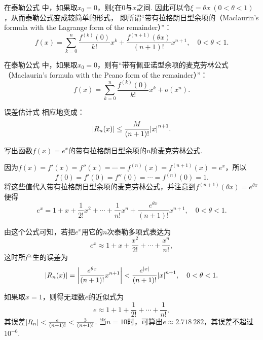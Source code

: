 在泰勒公式  中，如果取\(x_0 = 0\)，则\(\xi\)在\(0\)与\(x\)之间.
因此可以令\(\xi = \theta x\ (0 < \theta < 1)\)，从而泰勒公式变成较简单的形式，%
即所谓“带有拉格朗日型余项的（Maclaurin's formula with the Lagrange form of the remainder）”：
\begin{equation}\label{equation:微分中值定理.泰勒公式3}
f(x)=\sum_{k=0}^n \frac{f^{(k)}(0)}{k!} x^k
	+ \frac{f^{(n+1)}(\theta x)}{(n+1)!} x^{n+1},
\quad 0 < \theta < 1.
\end{equation}

在泰勒公式  中，如果取\(x_0 = 0\)，则有“带有佩亚诺型余项的麦克劳林公式（Maclaurin's formula with the Peano form of the remainder）”：
\begin{equation}\label{equation:微分中值定理.泰勒公式4}
f(x)=\sum_{k=0}^n \frac{f^{(k)}(0)}{k!} x^k + o(x^n).
\end{equation}

误差估计式  相应地变成：
\begin{equation}\label{equation:微分中值定理.泰勒公式.误差2}
\abs{R_n(x)} \leq \frac{M}{(n+1)!} \abs{x}^{n+1}.
\end{equation}

\begin{example}
写出函数\(f(x) = e^x\)的带有拉格朗日型余项的\(n\)阶麦克劳林公式.
\begin{solution}
因为\(f(x)=f'(x)=f''(x)=\dotsb=f^{(n)}(x)=f^{(n+1)}(x)=e^x\)，所以\[
f(0)=f'(0)=f''(0)=\dotsb=f^{(n)}(0)=1.
\]将这些值代入带有拉格朗日型余项的麦克劳林公式，并注意到\(f^{(n+1)}(\theta x) = e^{\theta x}\)便得\[
e^x = 1 + x + \frac{1}{2!} x^2 + \dotsb + \frac{1}{n!} x^n + \frac{e^{\theta x}}{(n+1)!} x^{n+1}, \quad 0 < \theta < 1.
\]

由这个公式可知，若把\(e^x\)用它的\(n\)次泰勒多项式表达为\[
e^x \approx 1 + x + \frac{x^2}{2!} + \dotsb + \frac{x^n}{n!},
\]这时所产生的误差为\[
\abs{R_n(x)} = \abs{\frac{e^{\theta x}}{(n+1)!} x^{n+1}}
< \frac{e^{\abs{x}}}{(n+1)!} \abs{x}^{n+1},
\quad 0 < \theta < 1.
\]

如果取\(x = 1\)，则得无理数\(e\)的近似式为\[
e \approx 1 + 1 + \frac{1}{2!} + \dotsb + \frac{1}{n!},
\]其误差\(\abs{R_n} < \frac{e}{(n+1)!} < \frac{3}{(n+1)!}\).
当\(n=10\)时，可算出\(e \approx 2.718\ 282\)，其误差不超过\(10^{-6}\).
\end{solution}
\end{example}

